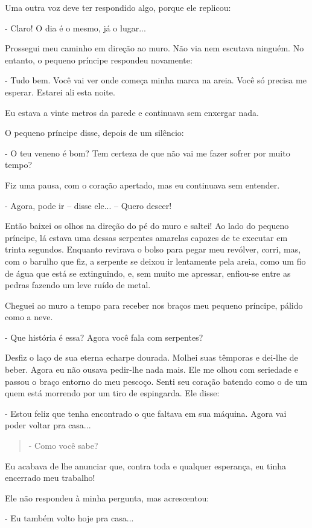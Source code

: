 Uma outra voz deve ter respondido algo, porque ele replicou:

- Claro! O dia é o mesmo, já o lugar...

Prossegui meu caminho em direção ao muro. Não via nem escutava ninguém.
No entanto, o pequeno príncipe respondeu novamente:

- Tudo bem. Você vai ver onde começa minha marca na areia. Você só
precisa me esperar. Estarei ali esta noite.

Eu estava a vinte metros da parede e continuava sem enxergar nada.

O pequeno príncipe disse, depois de um silêncio:

- O teu veneno é bom? Tem certeza de que não vai me fazer sofrer por
muito tempo?

Fiz uma pausa, com o coração apertado, mas eu continuava sem entender.

- Agora, pode ir -- disse ele... -- Quero descer!

Então baixei os olhos na direção do pé do muro e saltei! Ao lado do
pequeno príncipe, lá estava uma dessas serpentes amarelas capazes de te
executar em trinta segundos. Enquanto revirava o bolso para pegar meu
revólver, corri, mas, com o barulho que fiz, a serpente se deixou ir
lentamente pela areia, como um fio de água que está se extinguindo, e,
sem muito me apressar, enfiou-se entre as pedras fazendo um leve ruído
de metal.

Cheguei ao muro a tempo para receber nos braços meu pequeno príncipe,
pálido como a neve.

- Que história é essa? Agora você fala com serpentes?

Desfiz o laço de sua eterna echarpe dourada. Molhei suas têmporas e
dei-lhe de beber. Agora eu não ousava pedir-lhe nada mais. Ele me olhou
com seriedade e passou o braço entorno do meu pescoço. Senti seu coração
batendo como o de um quem está morrendo por um tiro de espingarda. Ele
disse:

- Estou feliz que tenha encontrado o que faltava em sua máquina. Agora
vai poder voltar pra casa...

\begin{quote}
- Como você sabe?
\end{quote}

Eu acabava de lhe anunciar que, contra toda e qualquer esperança, eu
tinha encerrado meu trabalho!

Ele não respondeu à minha pergunta, mas acrescentou:

- Eu também volto hoje pra casa...

